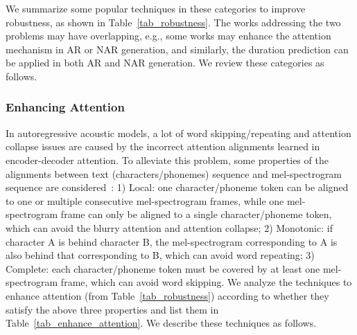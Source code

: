 \documentclass{article}
\begin{document}
We summarize some popular techniques in these categories to improve robustness, as shown in Table~\ref{tab_robustness}. The works addressing the two problems may have overlapping, e.g., some works may enhance the attention mechanism in AR or NAR generation, and similarly, the duration prediction can be applied in both AR and NAR generation. We review these categories as follows.



\subsubsection{Enhancing Attention} 
In autoregressive acoustic models, a lot of word skipping/repeating and attention collapse issues are caused by the incorrect attention alignments learned in encoder-decoder attention. To alleviate this problem, some properties of the alignments between text (characters/phonemes) sequence and mel-spectrogram sequence are considered~\cite{he2019robust}: 1) Local: one character/phoneme token can be aligned to one or multiple consecutive mel-spectrogram frames, while one mel-spectrogram frame can only be aligned to a single character/phoneme token, which can avoid the blurry attention and attention collapse; 2) Monotonic: if character A is behind character B, the mel-spectrogram corresponding to A is also behind that corresponding to B, which can avoid word repeating; 3) Complete: each character/phoneme token must be covered by at least one mel-spectrogram frame, which can avoid word skipping. We analyze the techniques to enhance attention (from Table~\ref{tab_robustness}) according to whether they satisfy the above three properties and list them in Table~\ref{tab_enhance_attention}. We describe these techniques as follows.
\end{document}
